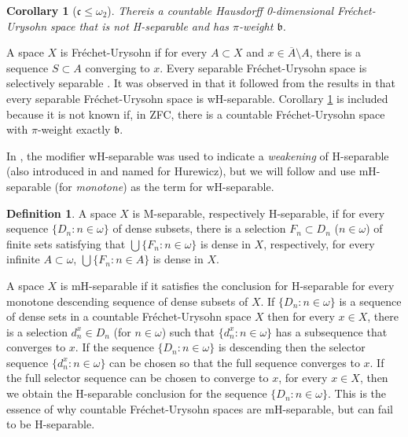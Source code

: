 \documentclass{amsart}
\newtheorem{corollary}[thm]{Corollary}
\theoremstyle{definition}
\newtheorem{definition}[thm]{Definition}
\theoremstyle{remark}
\begin{document}
\begin{corollary}[$\mathfrak c \leq \omega_2$] There\label{cor} is a countable Hausdorff 0-dimensional
Fr\'echet-Urysohn space that is not H-separable and has $\pi$-weight $\mathfrak b$.
\end{corollary}

A space $X$ is Fr\'echet-Urysohn if for every $A\subset  X$ and $x\in \overline{A}\setminus A$,
there is a sequence $S\subset A$ converging to $x$. Every separable Fr\'echet-Urysohn space
is selectively separable \cite{BaDo}. It was observed in \cite{BaMaZd}
that it followed from the results in \cite{GarySakai} that  every 
separable Fr\'echet-Urysohn space is wH-separable.  Corollary \ref{cor}
is included because it  is not known if, in ZFC,
 there is a countable Fr\'echet-Urysohn space with $\pi$-weight exactly 
  $\mathfrak b$. 

In \cite{GarySakai},  
the modifier wH-separable was used to indicate a
\textit{weakening} of H-separable (also introduced in \cite{BBM}
and named for Hurewicz), but we will follow \cite{BaMaZd} and use mH-separable (for \textit{monotone})
as the term for wH-separable.

 \begin{definition} A space $X$ is M-separable, respectively H-separable,
 if for every sequence $\{ D_n : n\in\omega\}$
  of dense subsets, there is a selection $F_n\subset D_n$ ($n\in\omega$) of finite sets
  satisfying that $\bigcup\{ F_n :n\in\omega\}$ is dense in $X$, respectively, for every
   infinite $A\subset \omega$, $\bigcup\{ F_n : n\in A\}$ is dense in $X$.
 \end{definition}

 A space $X$ is mH-separable if it satisfies the conclusion for H-separable for 
 every monotone descending sequence of dense subsets of $X$.  If $\{ D_n :
 n\in\omega\}$ is a sequence of dense sets in a  countable Fr\'echet-Urysohn
 space $X$  then for every $x\in  X$, there is a  
 selection $d^x_n\in D_n$ (for $n\in\omega$) such that $\{ d^x_n :n\in\omega\}$
 has a subsequence   that 
 converges to $x$.  
 If the sequence $\{ D_n : n\in\omega\}$
 is descending then the selector sequence $\{ d^x_n : n\in\omega\}$  
 can be chosen so that the full sequence converges to $x$. 
 If the full selector sequence can be chosen to  converge to $x$,
  for every $x\in X$, then we obtain the H-separable conclusion
  for the sequence $\{ D_n : n\in\omega\}$. 
  This is the essence of why countable Fr\'echet-Urysohn spaces 
  are mH-separable, but can fail to be H-separable.
 
\end{document}
